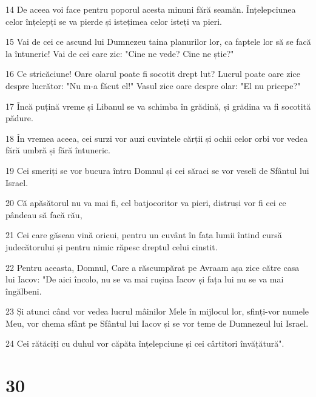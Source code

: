 \par 14 De aceea voi face pentru poporul acesta minuni fără seamăn. Înțelepciunea celor înțelepți se va pierde și istețimea celor isteți va pieri.
\par 15 Vai de cei ce ascund lui Dumnezeu taina planurilor lor, ca faptele lor să se facă la întuneric! Vai de cei care zic: "Cine ne vede? Cine ne știe?"
\par 16 Ce stricăciune! Oare olarul poate fi socotit drept lut? Lucrul poate oare zice despre lucrător: "Nu m-a făcut el!" Vasul zice oare despre olar: "El nu pricepe?"
\par 17 Încă puțină vreme și Libanul se va schimba în grădină, și grădina va fi socotită pădure.
\par 18 În vremea aceea, cei surzi vor auzi cuvintele cărții și ochii celor orbi vor vedea fără umbră și fără întuneric.
\par 19 Cei smeriți se vor bucura întru Domnul și cei săraci se vor veseli de Sfântul lui Israel.
\par 20 Că apăsătorul nu va mai fi, cel batjocoritor va pieri, distruși vor fi cei ce pândeau să facă rău,
\par 21 Cei care găseau vină oricui, pentru un cuvânt în fața lumii întind cursă judecătorului și pentru nimic răpesc dreptul celui cinstit.
\par 22 Pentru aceasta, Domnul, Care a răscumpărat pe Avraam așa zice către casa lui Iacov: "De aici încolo, nu se va mai rușina Iacov și fața lui nu se va mai îngălbeni.
\par 23 Și atunci când vor vedea lucrul mâinilor Mele în mijlocul lor, sfinți-vor numele Meu, vor chema sfânt pe Sfântul lui Iacov și se vor teme de Dumnezeul lui Israel.
\par 24 Cei rătăciți cu duhul vor căpăta înțelepciune și cei cârtitori învățătură".

\chapter{30}

